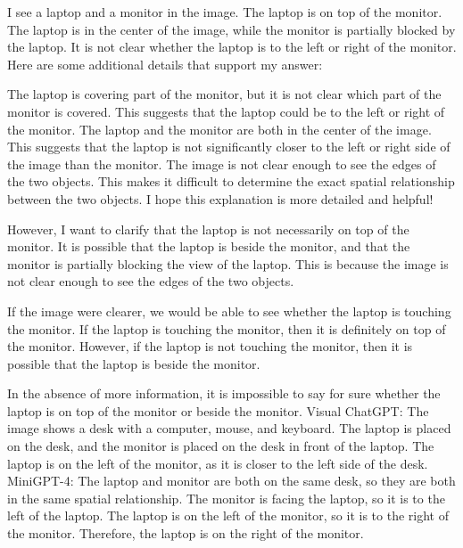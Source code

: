 \begin{enumerate}
    I see a laptop and a monitor in the image.
    The laptop is on top of the monitor.
    The laptop is in the center of the image, while the monitor is partially blocked by the laptop.
    It is not clear whether the laptop is to the left or right of the monitor.
    Here are some additional details that support my answer:
    
    The laptop is covering part of the monitor, but it is not clear which part of the monitor is covered. This suggests that the laptop could be to the left or right of the monitor.
    The laptop and the monitor are both in the center of the image. This suggests that the laptop is not significantly closer to the left or right side of the image than the monitor.
    The image is not clear enough to see the edges of the two objects. This makes it difficult to determine the exact spatial relationship between the two objects.
    I hope this explanation is more detailed and helpful!
    
    However, I want to clarify that the laptop is not necessarily on top of the monitor. It is possible that the laptop is beside the monitor, and that the monitor is partially blocking the view of the laptop. This is because the image is not clear enough to see the edges of the two objects.
    
    If the image were clearer, we would be able to see whether the laptop is touching the monitor. If the laptop is touching the monitor, then it is definitely on top of the monitor. However, if the laptop is not touching the monitor, then it is possible that the laptop is beside the monitor.
    
    In the absence of more information, it is impossible to say for sure whether the laptop is on top of the monitor or beside the monitor.
    \subitem Visual ChatGPT: The image shows a desk with a computer, mouse, and keyboard. The laptop is placed on the desk, and the monitor is placed on the desk in front of the laptop. The laptop is on the left of the monitor, as it is closer to the left side of the desk.
    \subitem MiniGPT-4: The laptop and monitor are both on the same desk, so they are both in the same spatial relationship. The monitor is facing the laptop, so it is to the left of the laptop. The laptop is on the left of the monitor, so it is to the right of the monitor. Therefore, the laptop is on the right of the monitor.
\end{enumerate}
